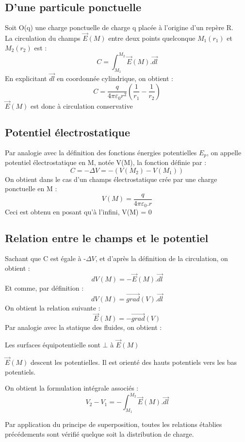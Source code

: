 \subsection{D'une particule ponctuelle}
Soit O(q) une charge ponctuelle de charge q placée à l'origine d'un repère R.\\
La circulation du champs $\overrightarrow{E}(M)$ entre deux points quelconque $M_1(r_1)$ et $M_2(r_2)$ est : 
$$C = \int_{M_1}^{M_2} \overrightarrow{E}(M).\overrightarrow{dl}$$
En explicitant $\overrightarrow{dl}$ en coordonnée cylindrique, on obtient :
$$C = \dfrac{q}{4\pi \varepsilon_0 r^2}(\dfrac{1}{r_1} - \dfrac{1}{r_2})$$
$\overrightarrow{E}(M)$ est donc à circulation conservative
\subsection{Potentiel électrostatique}
\begin{de}
Par analogie avec la définition des fonctions énergies potentielles $E_p$, on appelle potentiel électrostatique en M, notée V(M), la fonction définie par : 
$$C = -\Delta V = -(V(M_2)-V(M_1))$$
On obtient dans le cas d'un champs électrostatique crée par une charge ponctuelle en M :
$$V(M) = \dfrac{q}{4\pi \varepsilon_0.r}$$
Ceci est obtenu en posant qu'à l'infini, V(M) = 0
\end{de}
\subsection{Relation entre le champs et le potentiel}
Sachant que C est égale à -$\Delta V$, et d'après la définition de la circulation, on obtient :
$$dV(M) = -\overrightarrow{E}(M).\overrightarrow{dl}$$
Et comme, par définition : 
$$dV(M) = \overrightarrow{grad}(V).\overrightarrow{dl}$$
On obtient la relation suivante : 
$$\overrightarrow{E}(M) = -\overrightarrow{grad}(V)$$
Par analogie avec la statique des fluides, on obtient : 
\begin{prop}
Les surfaces équipotentielle sont $\bot$ à $\overrightarrow{E}(M)$
\end{prop}
\begin{prop}
$\overrightarrow{E}(M)$ descent les potentielles. Il est orienté des hauts potentiels vers les bas potentiels. 
\end{prop}
\begin{prop}
On obtient la formulation intégrale associés : 
$$V_2 - V_1 = -\int_{M_1}^{M_2} \overrightarrow{E}(M).\overrightarrow{dl}$$
\end{prop}
Par application du principe de superposition, toutes les relations établies précédements sont vérifié quelque soit la distribution de charge.
